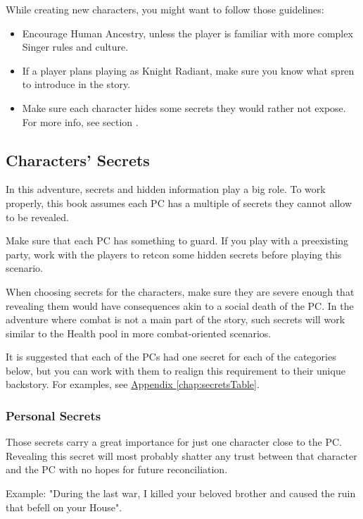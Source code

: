 While creating new characters, you might want to follow those guidelines:
\begin{itemize}
	\item Encourage Human Ancestry, unless the player is familiar with more complex Singer rules and culture.
	\item If a player plans playing as Knight Radiant, make sure you know what spren to introduce in the story.
	\item Make sure each character hides some secrets they would rather not expose. For more info, see section .
\end{itemize}



\subsection{Characters' Secrets}
\label{ssec:beforeStartingSecrets}

In this adventure, secrets and hidden information play a big role. To work properly, this book assumes each PC has a multiple of secrets they cannot allow to be revealed. 

Make sure that each PC has something to guard. If you play with a preexisting party, work with the players to retcon some hidden secrets before playing this scenario.

When choosing secrets for the characters, make sure they are severe enough that revealing them would have consequences akin to a social death of the PC. In the adventure where combat is not a main part of the story, such secrets will work similar to the Health pool in more combat-oriented scenarios.

It is suggested that each of the PCs had one secret for each of the categories below, but you can work with them to realign this requirement to their unique backstory. For examples, see \hyperref[chap:secretsTable]{Appendix \ref{chap:secretsTable}}.

\subsubsection{Personal Secrets}

Those secrets carry a great importance for just one character close to the PC. Revealing this secret will most probably shatter any trust between that character and the PC with no hopes for future reconciliation.

Example: "During the last war, I killed your beloved brother and caused the ruin that befell on your House".

